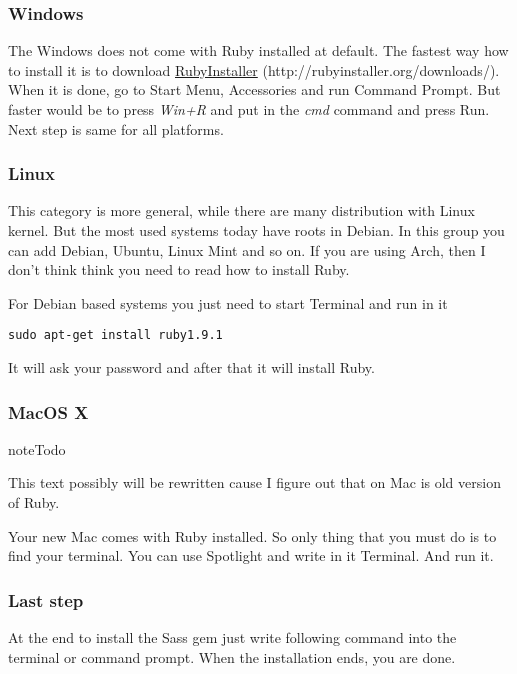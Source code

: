\documentclass[a4paper,12pt,oneside]{sphinxmanual}
\begin{document}
\subsubsection{Windows}
\label{src/sass:windows}
The Windows does not come with  Ruby installed at default. The fastest way how to install it is to download \href{http://rubyinstaller.org/downloads/}{RubyInstaller} (http://rubyinstaller.org/downloads/).
When it is done, go to Start Menu, Accessories and run Command Prompt. But faster would be to press \emph{Win+R} and put in the \emph{cmd} command and press Run. Next step is same for all platforms.


\subsubsection{Linux}
\label{src/sass:linux}
This category is more general, while there are many distribution with Linux kernel. But the most used systems today have roots in Debian. In this group you can add Debian, Ubuntu, Linux Mint and so on. If you are using Arch, then I don't think think you need to read how to install Ruby.

For Debian based systems you just need to start Terminal and run in it

\begin{Verbatim}[commandchars=\\\{\}]
sudo apt-get install ruby1.9.1
\end{Verbatim}

It will ask your password and after that it will install Ruby.


\subsubsection{MacOS X}
\label{src/sass:macos-x}
\begin{notice}{note}{Todo}

This text possibly will be rewritten cause I figure out that on Mac is old version of Ruby.
\end{notice}

Your new Mac comes with Ruby installed. So only thing that you must do is to find your terminal. You can use Spotlight and write in it Terminal. And run it.


\subsubsection{Last step}
\label{src/sass:last-step}
At the end to install the Sass gem just write following command into the terminal or command prompt. When the installation ends, you are done.
\end{document}
